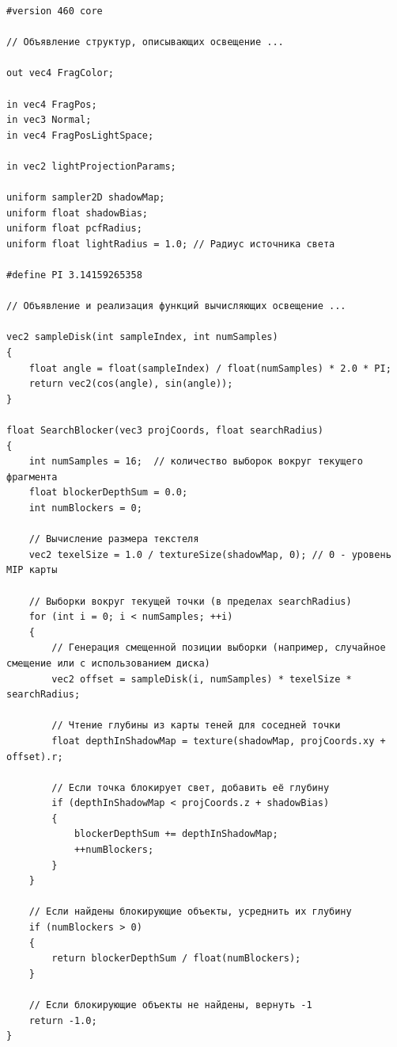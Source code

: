 \begin{center}
\captionsetup{justification=centering, singlelinecheck=off}
\begin{lstlisting}[label=lst:shadow_map_pcss_frag, caption=Фрагментный шейдер с учетом перспективного проецирония теней]
#version 460 core

// Объявление структур, описывающих освещение ...

out vec4 FragColor;

in vec4 FragPos;
in vec3 Normal;
in vec4 FragPosLightSpace;

in vec2 lightProjectionParams;

uniform sampler2D shadowMap;
uniform float shadowBias;
uniform float pcfRadius;
uniform float lightRadius = 1.0; // Радиус источника света

#define PI 3.14159265358

// Объявление и реализация функций вычисляющих освещение ...

vec2 sampleDisk(int sampleIndex, int numSamples)
{
    float angle = float(sampleIndex) / float(numSamples) * 2.0 * PI;
    return vec2(cos(angle), sin(angle));
}

float SearchBlocker(vec3 projCoords, float searchRadius)
{
    int numSamples = 16;  // количество выборок вокруг текущего фрагмента
    float blockerDepthSum = 0.0;
    int numBlockers = 0;

    // Вычисление размера текстеля
    vec2 texelSize = 1.0 / textureSize(shadowMap, 0); // 0 - уровень MIP карты

    // Выборки вокруг текущей точки (в пределах searchRadius)
    for (int i = 0; i < numSamples; ++i)
    {
        // Генерация смещенной позиции выборки (например, случайное смещение или с использованием диска)
        vec2 offset = sampleDisk(i, numSamples) * texelSize * searchRadius;

        // Чтение глубины из карты теней для соседней точки
        float depthInShadowMap = texture(shadowMap, projCoords.xy + offset).r;

        // Если точка блокирует свет, добавить её глубину
        if (depthInShadowMap < projCoords.z + shadowBias)
        {
            blockerDepthSum += depthInShadowMap;
            ++numBlockers;
        }
    }

    // Если найдены блокирующие объекты, усреднить их глубину
    if (numBlockers > 0)
    {
        return blockerDepthSum / float(numBlockers);
    }

    // Если блокирующие объекты не найдены, вернуть -1
    return -1.0;
}


\end{lstlisting}
\end{center}
